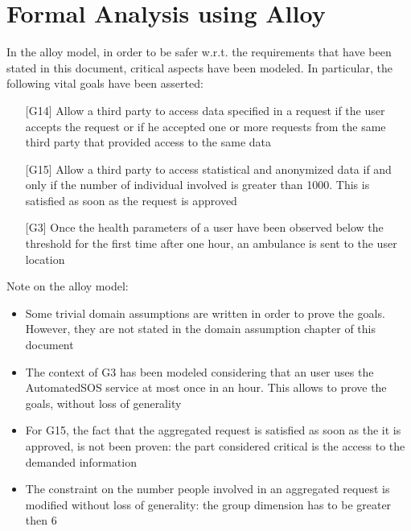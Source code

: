 \section{Formal Analysis using Alloy}
In the alloy model, in order to be safer w.r.t. the requirements that have been stated in this document, critical aspects have been modeled. 
In particular, the following vital goals have been asserted:
\begin{enumerate}
\item[{[G14]}]  Allow a third party to access data specified in a request if the user accepts the request or if he accepted one or more requests from the same third party that provided access to the same data 
\item[{[G15]}] Allow a third party to access statistical and anonymized data if and only if the number of individual involved is greater than 1000. This is satisfied as soon as the request is approved  
\item[{[G3]}] Once the health parameters of a user have been observed below the threshold for the first time after one hour, an ambulance is sent to the user location
\end{enumerate}

Note on the alloy model: 
\begin{itemize}
\item Some trivial domain assumptions are written in order to prove the goals. However, they are 
not stated in the domain assumption chapter of this document 
\item The context of G3 has been modeled considering that an user uses the AutomatedSOS service at most once in an hour. This allows to prove the goals, without loss of generality 
\item For G15, the fact that the aggregated request is satisfied as soon as the it is approved, is not been proven: the part considered critical is the access to the demanded information 
\item The constraint on the number people involved in an aggregated request is modified without loss of generality: the group dimension has to be greater then 6 
\end{itemize}

